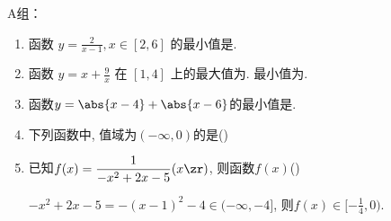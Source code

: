 A组：
\begin{enumerate}
\item 函数 $y=\frac{2}{x-1}, x \in[2,6]$ 的最小值是.

\item 函数 $y=x+\frac{9}{x}$ 在 $[1,4]$ 上的最大值为. 最小值为.

\item 函数$y=\abs{x-4}+\abs{x-6}$的最小值是. 

\item 下列函数中, 值域为$(-\infty,0)$的是\dotfill()


\item 已知$f(x)=\dfrac{1}{-x^2+2x-5}(x\zr)$, 则函数$f(x)$\dotfill()
\begin{jieda}
$-x^2+2x-5=-(x-1)^2-4\in(-\infty,-4]$, 则$f(x)\in[-\frac{1}{4},0)$. 
\end{jieda}

\end{enumerate}


